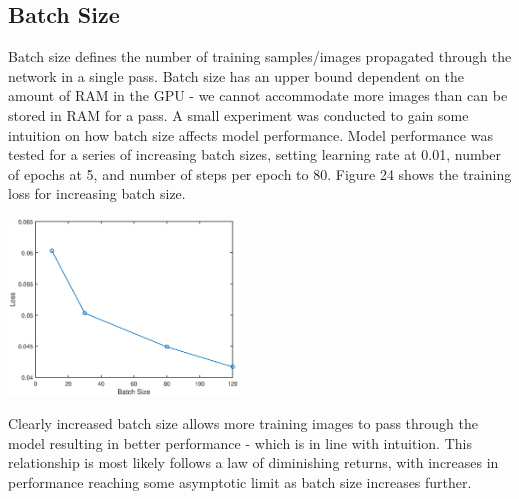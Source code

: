 \documentclass[a4paper]{article}
\begin{document}
\subsection{Batch Size}
\begin{minipage}{0.45\textwidth}
Batch size defines the number of training samples/images propagated through the network in a single pass. Batch size has an upper bound dependent on the amount of RAM in the GPU - we cannot accommodate more images than can be stored in RAM for a pass. A small experiment was conducted to gain some intuition on how batch size affects model performance. Model performance was tested for a series of increasing batch sizes, setting learning rate at 0.01, number of epochs at 5, and number of steps per epoch to 80. Figure 24 shows the training loss for increasing batch size.
\end{minipage}
\hspace{1cm}
\begin{minipage}{0.45\textwidth}
\centering
\includegraphics[height=4.7cm]{hyp_par_1}
\end{minipage}

\vspace{0.3cm}

Clearly increased batch size allows more training images to pass through the model resulting in better performance - which is in line with intuition. This relationship is most likely follows a law of diminishing returns, with increases in performance reaching some asymptotic limit as batch size increases further.
\end{document}
